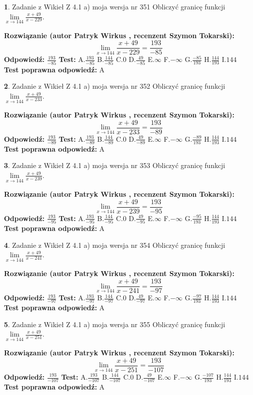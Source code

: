 \documentclass[12pt, a4paper]{article}
\theoremstyle{definition} %
\newtheorem{zad}{}
\newcommand{\zadStart}[1]{\begin{zad}#1\newline}
\newcommand{\zadStop}{\end{zad}}
\newcommand{\rozwStart}[2]{\noindent \textbf{Rozwiązanie (autor #1 , recenzent #2): }\newline}
\newcommand{\rozwStop}{\newline}
\newcommand{\odpStart}{\noindent \textbf{Odpowiedź:}\newline}
\newcommand{\odpStop}{\newline}
\newcommand{\testStart}{\noindent \textbf{Test:}\newline}
\newcommand{\testStop}{\newline}
\newcommand{\kluczStart}{\noindent \textbf{Test poprawna odpowiedź:}\newline}
\newcommand{\kluczStop}{\newline}
\begin{document}
\zadStart{Zadanie z Wikieł Z 4.1 a) moja wersja nr 351}
Obliczyć granicę funkcji $\lim\limits_{x\to144}\frac{x+49}{x-229}$.
\zadStop
\rozwStart{Patryk Wirkus}{Szymon Tokarski}
$$\lim\limits_{x\to144}\frac{x+49}{x-229} = \frac{193}{-85}$$
\rozwStop
\odpStart
$\frac{193}{-85}$
\odpStop
\testStart
A.$\frac{193}{-85}$
B.$\frac{144}{-85}$
C.$0$
D.$\frac{49}{-85}$
E.$\infty$
F.$-\infty$
G.$\frac{-85}{193}$
H.$\frac{144}{193}$
I.$144$
\testStop
\kluczStart
A
\kluczStop



\zadStart{Zadanie z Wikieł Z 4.1 a) moja wersja nr 352}
Obliczyć granicę funkcji $\lim\limits_{x\to144}\frac{x+49}{x-233}$.
\zadStop
\rozwStart{Patryk Wirkus}{Szymon Tokarski}
$$\lim\limits_{x\to144}\frac{x+49}{x-233} = \frac{193}{-89}$$
\rozwStop
\odpStart
$\frac{193}{-89}$
\odpStop
\testStart
A.$\frac{193}{-89}$
B.$\frac{144}{-89}$
C.$0$
D.$\frac{49}{-89}$
E.$\infty$
F.$-\infty$
G.$\frac{-89}{193}$
H.$\frac{144}{193}$
I.$144$
\testStop
\kluczStart
A
\kluczStop



\zadStart{Zadanie z Wikieł Z 4.1 a) moja wersja nr 353}
Obliczyć granicę funkcji $\lim\limits_{x\to144}\frac{x+49}{x-239}$.
\zadStop
\rozwStart{Patryk Wirkus}{Szymon Tokarski}
$$\lim\limits_{x\to144}\frac{x+49}{x-239} = \frac{193}{-95}$$
\rozwStop
\odpStart
$\frac{193}{-95}$
\odpStop
\testStart
A.$\frac{193}{-95}$
B.$\frac{144}{-95}$
C.$0$
D.$\frac{49}{-95}$
E.$\infty$
F.$-\infty$
G.$\frac{-95}{193}$
H.$\frac{144}{193}$
I.$144$
\testStop
\kluczStart
A
\kluczStop



\zadStart{Zadanie z Wikieł Z 4.1 a) moja wersja nr 354}
Obliczyć granicę funkcji $\lim\limits_{x\to144}\frac{x+49}{x-241}$.
\zadStop
\rozwStart{Patryk Wirkus}{Szymon Tokarski}
$$\lim\limits_{x\to144}\frac{x+49}{x-241} = \frac{193}{-97}$$
\rozwStop
\odpStart
$\frac{193}{-97}$
\odpStop
\testStart
A.$\frac{193}{-97}$
B.$\frac{144}{-97}$
C.$0$
D.$\frac{49}{-97}$
E.$\infty$
F.$-\infty$
G.$\frac{-97}{193}$
H.$\frac{144}{193}$
I.$144$
\testStop
\kluczStart
A
\kluczStop



\zadStart{Zadanie z Wikieł Z 4.1 a) moja wersja nr 355}
Obliczyć granicę funkcji $\lim\limits_{x\to144}\frac{x+49}{x-251}$.
\zadStop
\rozwStart{Patryk Wirkus}{Szymon Tokarski}
$$\lim\limits_{x\to144}\frac{x+49}{x-251} = \frac{193}{-107}$$
\rozwStop
\odpStart
$\frac{193}{-107}$
\odpStop
\testStart
A.$\frac{193}{-107}$
B.$\frac{144}{-107}$
C.$0$
D.$\frac{49}{-107}$
E.$\infty$
F.$-\infty$
G.$\frac{-107}{193}$
H.$\frac{144}{193}$
I.$144$
\testStop
\kluczStart
A
\kluczStop
\end{document}
